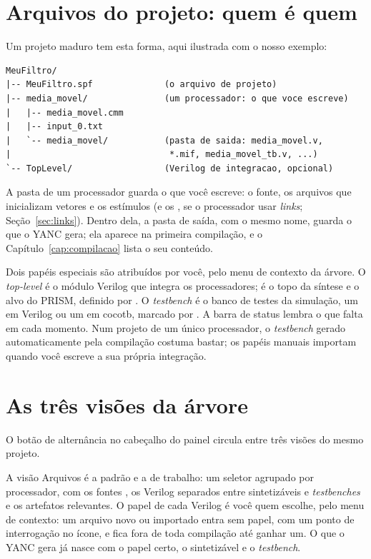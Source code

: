 \section{Arquivos do projeto: quem é quem}
\label{sec:arquivos-do-projeto}

Um projeto maduro tem esta forma, aqui ilustrada com o nosso exemplo:

\begin{lstlisting}
MeuFiltro/
|-- MeuFiltro.spf              (o arquivo de projeto)
|-- media_movel/               (um processador: o que voce escreve)
|   |-- media_movel.cmm
|   |-- input_0.txt
|   `-- media_movel/           (pasta de saida: media_movel.v,
|                               *.mif, media_movel_tb.v, ...)
`-- TopLevel/                  (Verilog de integracao, opcional)
\end{lstlisting}

A pasta de um processador guarda o que você escreve: o fonte, os arquivos que inicializam vetores e os estímulos  (e os , se o processador usar \textit{links}; Seção~\ref{sec:links}). Dentro dela, a pasta de saída, com o mesmo nome, guarda o que o YANC gera; ela aparece na primeira compilação, e o Capítulo~\ref{cap:compilacao} lista o seu conteúdo.

Dois papéis especiais são atribuídos por você, pelo menu de contexto da árvore. O \textit{top-level} é o módulo Verilog que integra os processadores; é o topo da síntese e o alvo do PRISM, definido por . O \textit{testbench} é o banco de testes da simulação, um  em Verilog ou um  em cocotb, marcado por . A barra de status lembra o que falta em cada momento. Num projeto de um único processador, o \textit{testbench} gerado automaticamente pela compilação costuma bastar; os papéis manuais importam quando você escreve a sua própria integração.

\section{As três visões da árvore}
\label{sec:tres-arvores}

O botão de alternância no cabeçalho do painel circula entre três visões do mesmo projeto.

A visão Arquivos é a padrão e a de trabalho: um seletor agrupado por processador, com os fontes \cmm{}, os Verilog separados entre sintetizáveis e \textit{testbenches} e os artefatos relevantes. O papel de cada Verilog é você quem escolhe, pelo menu de contexto: um arquivo novo ou importado entra sem papel, com um ponto de interrogação no ícone, e fica fora de toda compilação até ganhar um. O que o YANC gera já nasce com o papel certo, o  sintetizável e o  \textit{testbench}.

